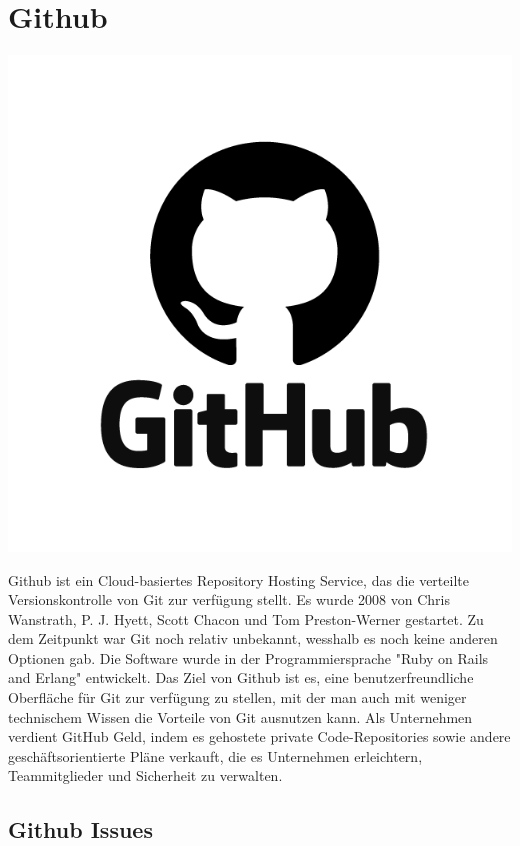 \section{Github}
\includegraphics[scale=0.075]{pics/logos/githubLogo.png}

Github ist ein Cloud-basiertes Repository Hosting Service, das die verteilte Versionskontrolle von Git zur verfügung stellt. Es wurde 2008 von Chris Wanstrath, P. J. Hyett, 
Scott Chacon und Tom Preston-Werner gestartet. Zu dem Zeitpunkt war Git noch relativ unbekannt, wesshalb es noch keine anderen Optionen gab. Die Software wurde in der 
Programmiersprache "Ruby on Rails and Erlang" entwickelt. 
\cite{sysarch-github-1}
Das Ziel von Github ist es, eine benutzerfreundliche Oberfläche für Git zur verfügung zu stellen, mit der man auch mit weniger technischem Wissen die Vorteile von Git ausnutzen kann.
\cite{sysarch-github-2}
Als Unternehmen verdient GitHub Geld, indem es gehostete private Code-Repositories sowie andere geschäftsorientierte Pläne verkauft, 
die es Unternehmen erleichtern, Teammitglieder und Sicherheit zu verwalten.
\cite{sysarch-github-2}

\subsection{Github Issues}

